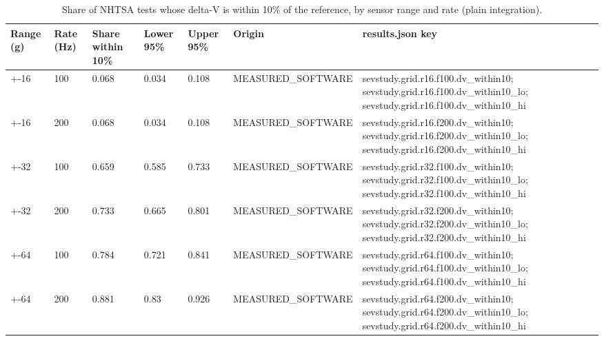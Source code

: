 \begin{table}[t]
\centering
\small
\caption{Share of NHTSA tests whose delta-V is within 10\% of the reference, by sensor range and rate (plain integration).}
\label{tab:tab_sensor_range}
\begin{tabular}{lllllll}
\toprule
Range (g) & Rate (Hz) & Share within 10\% & Lower 95\% & Upper 95\% & Origin & results.json key \\
\midrule
+-16 & 100 & 0.068 & 0.034 & 0.108 & MEASURED\_SOFTWARE & sevstudy.grid.r16.f100.dv\_within10; sevstudy.grid.r16.f100.dv\_within10\_lo; sevstudy.grid.r16.f100.dv\_within10\_hi \\
+-16 & 200 & 0.068 & 0.034 & 0.108 & MEASURED\_SOFTWARE & sevstudy.grid.r16.f200.dv\_within10; sevstudy.grid.r16.f200.dv\_within10\_lo; sevstudy.grid.r16.f200.dv\_within10\_hi \\
+-32 & 100 & 0.659 & 0.585 & 0.733 & MEASURED\_SOFTWARE & sevstudy.grid.r32.f100.dv\_within10; sevstudy.grid.r32.f100.dv\_within10\_lo; sevstudy.grid.r32.f100.dv\_within10\_hi \\
+-32 & 200 & 0.733 & 0.665 & 0.801 & MEASURED\_SOFTWARE & sevstudy.grid.r32.f200.dv\_within10; sevstudy.grid.r32.f200.dv\_within10\_lo; sevstudy.grid.r32.f200.dv\_within10\_hi \\
+-64 & 100 & 0.784 & 0.721 & 0.841 & MEASURED\_SOFTWARE & sevstudy.grid.r64.f100.dv\_within10; sevstudy.grid.r64.f100.dv\_within10\_lo; sevstudy.grid.r64.f100.dv\_within10\_hi \\
+-64 & 200 & 0.881 & 0.83 & 0.926 & MEASURED\_SOFTWARE & sevstudy.grid.r64.f200.dv\_within10; sevstudy.grid.r64.f200.dv\_within10\_lo; sevstudy.grid.r64.f200.dv\_within10\_hi \\
\bottomrule
\end{tabular}
\end{table}
